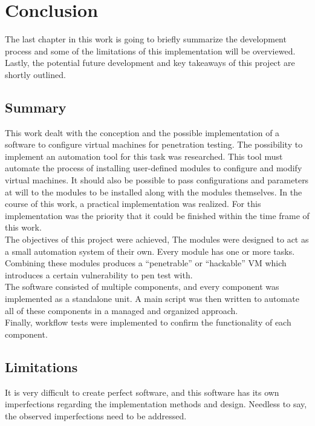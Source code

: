 \chapter{Conclusion}
The last chapter in this work is going to briefly summarize the development process and some of the limitations of this implementation will be overviewed. Lastly, the potential future development and key takeaways of this project are shortly outlined.

\section{Summary}
This work dealt with the conception and the possible implementation of a software to configure virtual machines for penetration testing. The possibility to implement an automation tool for this task was researched. This tool must automate the process of installing user-defined modules to configure and modify virtual machines. It should also be possible to pass configurations and parameters at will to the modules to be installed along with the modules themselves.
In the course of this work, a practical implementation was realized. For this implementation
was the priority that it could be finished within the time frame of this work.\\
The objectives of this project were achieved,
The modules were designed to act as a small automation system of their own. Every module has one or more tasks. Combining these modules produces a “penetrable” or “hackable” VM which introduces a certain vulnerability to pen test with.\\
The software consisted of multiple components, and every component was implemented as a standalone unit. A main script was then written to automate all of these components in a managed and organized approach.\\ Finally, workflow tests were implemented to confirm the functionality of each component.

\section{Limitations}
It is very difficult to create perfect software, and this software has its own imperfections regarding the implementation methods and design. Needless to say, the observed imperfections need to be addressed.

